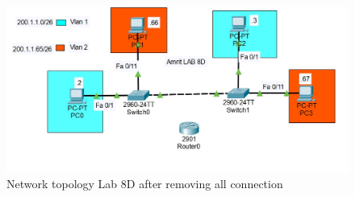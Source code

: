 \documentclass[a4paper,11pt]{article}
\begin{document}
\begin{figure}[H]
    \centering
    \includegraphics[scale=0.8,cframe=blue 0.5pt 3pt,width=\linewidth]{./FIG/Lab8D.jpg}
    \caption{Network topology Lab 8D after removing all connection}
\end{figure}

\end{document}
